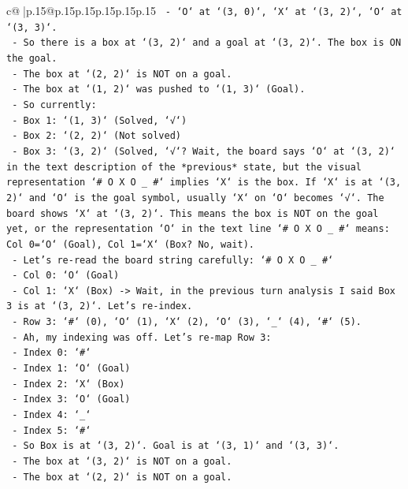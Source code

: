 \documentclass{article}
\begin{document}
{\begin{supertabular}{c@{$\;$}|p{.15\linewidth}@{}p{.15\linewidth}p{.15\linewidth}p{.15\linewidth}p{.15\linewidth}p{.15\linewidth}}
{{{\texttt{    {-} `O` at `(3, 0)`, `X` at `(3, 2)`, `O` at `(3, 3)`.} \\
\texttt{    {-} So there is a box at `(3, 2)` and a goal at `(3, 2)`. The box is ON the goal.} \\
\texttt{    {-} The box at `(2, 2)` is NOT on a goal.} \\
\texttt{    {-} The box at `(1, 2)` was pushed to `(1, 3)` (Goal).} \\
\texttt{    {-} So currently:} \\
\texttt{        {-} Box 1: `(1, 3)` (Solved, `√`)} \\
\texttt{        {-} Box 2: `(2, 2)` (Not solved)} \\
\texttt{        {-} Box 3: `(3, 2)` (Solved, `√`? Wait, the board says `O` at `(3, 2)` in the text description of the *previous* state, but the visual representation `\# O X O \_ \#` implies `X` is the box. If `X` is at `(3, 2)` and `O` is the goal symbol, usually `X` on `O` becomes `√`. The board shows `X` at `(3, 2)`. This means the box is NOT on the goal yet, or the representation `O` in the text line `\# O X O \_ \#` means: Col 0=`O` (Goal), Col 1=`X` (Box? No, wait).} \\
\texttt{    {-} Let's re{-}read the board string carefully: `\# O X O \_ \#`} \\
\texttt{        {-} Col 0: `O` (Goal)} \\
\texttt{        {-} Col 1: `X` (Box) {-}> Wait, in the previous turn analysis I said Box 3 is at `(3, 2)`. Let's re{-}index.} \\
\texttt{        {-} Row 3: `\#` (0), `O` (1), `X` (2), `O` (3), `\_` (4), `\#` (5).} \\
\texttt{        {-} Ah, my indexing was off. Let's re{-}map Row 3:} \\
\texttt{          {-} Index 0: `\#`} \\
\texttt{          {-} Index 1: `O` (Goal)} \\
\texttt{          {-} Index 2: `X` (Box)} \\
\texttt{          {-} Index 3: `O` (Goal)} \\
\texttt{          {-} Index 4: `\_`} \\
\texttt{          {-} Index 5: `\#`} \\
\texttt{        {-} So Box is at `(3, 2)`. Goal is at `(3, 1)` and `(3, 3)`.} \\
\texttt{        {-} The box at `(3, 2)` is NOT on a goal.} \\
\texttt{        {-} The box at `(2, 2)` is NOT on a goal.} \\
}}}
\end{supertabular}}
\end{document}
